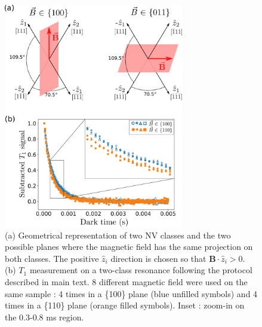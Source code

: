 \documentclass[preprintnumbers,amsmath,amssymb,onecolumn,12pt]{revtex4-2}\usepackage{graphicx}%
\begin{document}
\begin{figure}
\includegraphics[width=0.7\textwidth]{Figures_SI/121_VS_22}
\caption{(a) Geometrical representation of two NV classes and the two possible planes where the magnetic field has the same projection on both classes. The positive $\hat z_i$ direction is chosen so that $\bm{B}\cdot \hat{z}_i >0$. (b) $T_1$ measurement on a two-class resonance following the protocol described in main text. 8 different magnetic field were used on the same sample : 4 times in a \{100\} plane (blue unfilled symbols) and 4 times in a \{110\} plane (orange filled symbols). Inset : zoom-in on the 0.3-0.8 ms region.}
\label{ VS 22 fig}
\end{figure}
\end{document}
